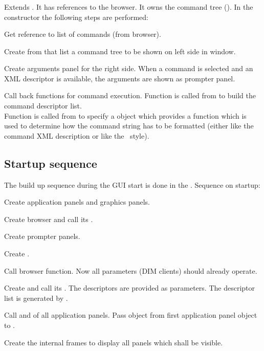 \subsubsection{}
Extends .
It has references to the browser. It owns the command tree (). In the constructor
the following steps are performed:
\bnum
\item Get reference to list of commands (from browser).
\item Create from that list a command tree to be shown on left side in window.
\item Create arguments panel for the right side. When a command is selected and
an XML descriptor is available, the arguments are shown as prompter panel.
\item Call back functions for command execution.
\enum
Function  is called from  to build
the command descriptor list.\\
Function  is called from  to specify
a  object which provides a function 
which is used to determine how the command string has to be formatted (either
like the command XML description or like the \mbs\ style).
\subsection{Startup sequence}
The build up sequence during the GUI start 
is done in the .
Sequence on startup:
\bnum
\item Create application panels and graphics panels.
\item Create browser  and call its .
\item Create prompter panels.
\item Create .
\item Call browser  function. 
Now all parameters (DIM clients) should already operate.
\item Create  and call its .
The descriptors are provided as parameters. The descriptor list is
generated by .
\item Call  and  of all application panels. Pass
 object from first application panel object to .
\item Create the internal frames to display all panels which shall be visible.
\enum 
